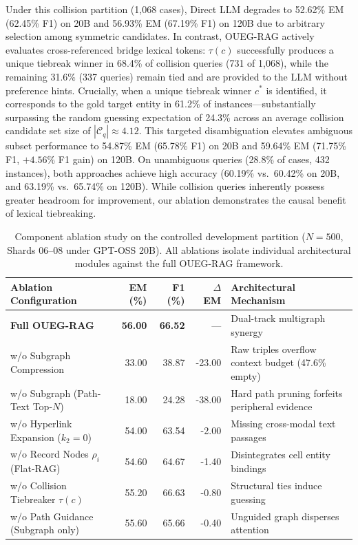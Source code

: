 \documentclass[runningheads]{llncs}
\begin{document}
Under this collision partition (1,068 cases), Direct LLM degrades to 52.62\% EM (62.45\% F1) on 20B and 56.93\% EM (67.19\% F1) on 120B due to arbitrary selection among symmetric candidates. In contrast, OUEG-RAG actively evaluates cross-referenced bridge lexical tokens: $\tau(c)$ successfully produces a unique tiebreak winner in 68.4\% of collision queries (731 of 1,068), while the remaining 31.6\% (337 queries) remain tied and are provided to the LLM without preference hints. Crucially, when a unique tiebreak winner $c^*$ is identified, it corresponds to the gold target entity in 61.2\% of instances---substantially surpassing the random guessing expectation of 24.3\% across an average collision candidate set size of $|\mathcal{C}_q| \approx 4.12$. This targeted disambiguation elevates ambiguous subset performance to 54.87\% EM (65.78\% F1) on 20B and 59.64\% EM (71.75\% F1, $+4.56\%$ F1 gain) on 120B. On unambiguous queries (28.8\% of cases, 432 instances), both approaches achieve high accuracy (60.19\% vs.\ 60.42\% on 20B, and 63.19\% vs.\ 65.74\% on 120B). While collision queries inherently possess greater headroom for improvement, our ablation demonstrates the causal benefit of lexical tiebreaking.

\begin{table}[t]
\caption{Component ablation study on the controlled development partition ($N=500$, Shards 06--08 under GPT-OSS 20B). All ablations isolate individual architectural modules against the full OUEG-RAG framework.}
\label{tab:ablation}
\centering
\scriptsize
\setlength{\tabcolsep}{2.0pt}
\begin{tabular}{@{}lrrrp{3.8cm}@{}}
\toprule
Ablation Configuration & EM (\%) & F1 (\%) & $\Delta$ EM & Architectural Mechanism \\
\midrule
\textbf{Full OUEG-RAG} & \textbf{56.00} & \textbf{66.52} & --- & Dual-track multigraph synergy \\
\midrule
w/o Subgraph Compression & 33.00 & 38.87 & -23.00 & Raw triples overflow context budget (47.6\% empty) \\
w/o Subgraph (Path-Text Top-$N$) & 18.00 & 24.28 & -38.00 & Hard path pruning forfeits peripheral evidence \\
w/o Hyperlink Expansion ($k_2=0$) & 54.00 & 63.54 & -2.00 & Missing cross-modal text passages \\
w/o Record Nodes $\rho_i$ (Flat-RAG) & 54.60 & 64.67 & -1.40 & Disintegrates cell entity bindings \\
w/o Collision Tiebreaker $\tau(c)$ & 55.20 & 66.63 & -0.80 & Structural ties induce guessing \\
w/o Path Guidance (Subgraph only) & 55.60 & 65.66 & -0.40 & Unguided graph disperses attention \\
\bottomrule
\end{tabular}
\end{table}
\end{document}
